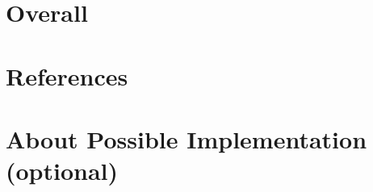 \documentclass{article}
\begin{document}
\section*{Overall}
\section*{References}
\section*{About Possible Implementation (optional)}


\end{document}
